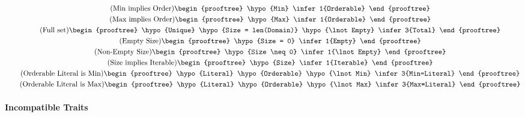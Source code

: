 \begin{gather}
  \\
  \tag{Min implies Order}
  \begin{prooftree}
    \hypo{Min}
    \infer1{Orderable}
  \end{prooftree}
  \\
  \tag{Max implies Order}
  \begin{prooftree}
    \hypo{Max}
    \infer1{Orderable}
  \end{prooftree}
  \\
  \tag{Full set}
  \begin{prooftree}
    \hypo{Unique}
    \hypo{Size = len(Domain)}
    \hypo{\lnot Empty} %
    \infer3{Total}
  \end{prooftree}
  \\
  \tag{Empty Size}
  \begin{prooftree}
    \hypo{Size = 0}
    \infer1{Empty}
  \end{prooftree}
  \\
  \tag{Non-Empty Size}
  \begin{prooftree}
    \hypo{Size \neq 0}
    \infer1{\lnot Empty}
  \end{prooftree}
  \\
  \tag{Size implies Iterable}
  \begin{prooftree}
    \hypo{Size}
    \infer1{Iterable}
  \end{prooftree}
  \\
  \tag{Orderable Literal is Min}
  \begin{prooftree}
    \hypo{Literal}
    \hypo{Orderable}
    \hypo{\lnot Min}
    \infer3{Min=Literal}
  \end{prooftree}
  \\
  \tag{Orderable Literal is Max}
  \begin{prooftree}
    \hypo{Literal}
    \hypo{Orderable}
    \hypo{\lnot Max}
    \infer3{Max=Literal}
  \end{prooftree}
\end{gather}

\paragraph{Incompatible Traits}

